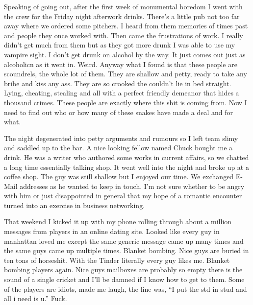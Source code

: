 Speaking of going out, after the first week of monumental boredom I went with the crew for the Friday night afterwork drinks. There's a little pub not too far away where we ordered some pitchers. I heard from them memories of times past and people they once worked with. Then came the frustrations of work. I really didn't get much from them but as they got more drunk I was able to use my vampire sight. I don't get drunk on alcohol by the way. It just comes out just as alcoholicn as it went in. Weird. Anyway what I found is that these people are scoundrels, the whole lot of them. They are shallow and petty, ready to take any bribe and kiss any ass. They are so crooked the couldn't lie in bed straight. Lying, cheating, stealing and all with a perfect friendly demeanor that hides a thousand crimes. These people are exactly where this shit is coming from. Now I need to find out who or how many of these snakes have made a deal and for what.

The night degenerated into petty arguments and rumours so I left team slimy and saddled up to the bar. A nice looking fellow named Chuck bought me a drink. He was a writer who authored some works in current affairs, so we chatted a long time essentially talking shop. It went well into the night and broke up at a coffee shop. The guy was still shallow but I enjoyed our time. We exchanged E-Mail addresses as he wanted to keep in touch. I'm not sure whether to be angry with him or just disappointed in general that my hope of a romantic encounter turned into an exercise in business networking.

That weekend I kicked it up with my phone rolling through about a million messages from players in an online dating site. Looked like every guy in manhattan loved me except the same generic message came up many times and the same guys came up multiple times. Blanket bombing. Nice guys are buried in ten tons of horseshit. With the Tinder literally every guy likes me. Blanket bombing players again. Nice guys mailboxes are probably so empty there is the sound of a single cricket and I'll be damned if I know how to get to them. Some of the players are idiots, made me laugh, the line was, ``I put the std in stud and all i need is u.'' Fuck.

